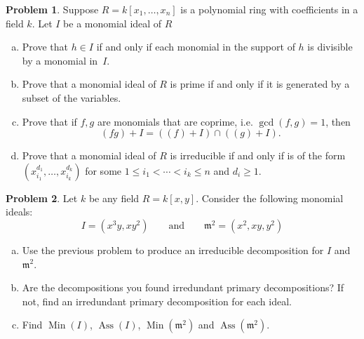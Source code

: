 \documentclass[11pt]{article}
\DeclareMathOperator{\Ass}{Ass}
\DeclareMathOperator{\Min}{Min}
\newcommand{\m}{\mathfrak{m}}
\theoremstyle{definition}
\newtheorem{problem}{Problem}
\begin{document}
\noindent
{}


\begin{problem}
Suppose $R = k[x_1,\ldots, x_n]$ is a polynomial ring with coefficients in a field $k$. 
Let $I$ be a monomial ideal of $R$
\begin{enumerate}[a)]
\item Prove that $h\in I$ if and only if each monomial in the support of $h$ is divisible by a monomial in~$I$. 
\item Prove that a monomial ideal of $R$ is prime if and only if it is generated by a subset of the variables.
\item Prove that if $f,g$ are monomials that are coprime, i.e. $\gcd(f,g)=1$, then 
$$(fg)+I=((f)+I)\cap ((g)+I).$$
\item Prove that a monomial ideal of $R$ is irreducible if and only if is of the form $(x_{i_1}^{d_1}, \ldots, x_{i_k}^{d_k})$ for some $1 \leqslant i_1< \cdots <i_k \leqslant n$ and $d_i \geqslant 1$.
\end{enumerate}
\end{problem}


\begin{problem}
Let $k$ be any field $R = k[x,y]$. Consider the following monomial ideals:
$$I = (x^3y, xy^2) \qquad \textrm{and} \qquad \m^2 = (x^2,xy, y^2)$$
\begin{enumerate}[a)]
\item Use the previous problem to produce an irreducible decomposition for $I$ and $\m^2$.
\item Are the decompositions you found irredundant primary decompositions? If not, find an irredundant primary decomposition for each ideal.
\item Find $\Min(I)$, $\Ass(I)$, $\Min(\m^2)$ and $\Ass(\m^2)$.
\end{enumerate}
\end{problem}
\end{document}
